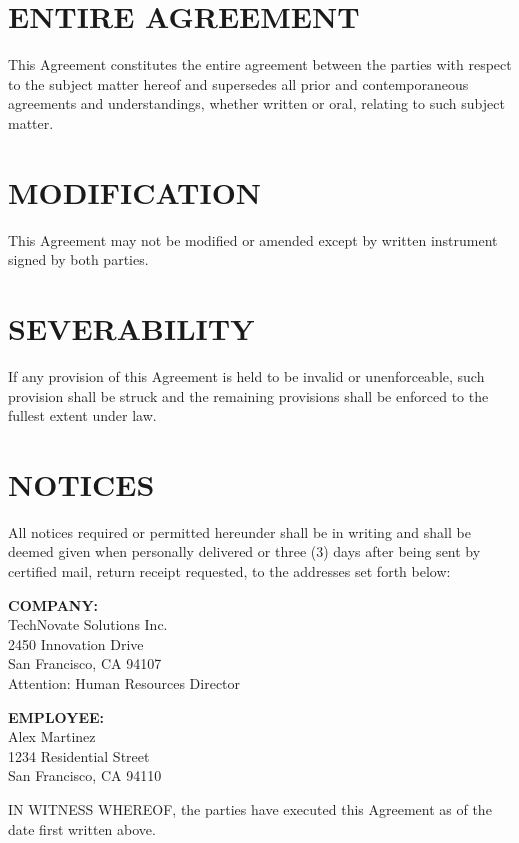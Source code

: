 \documentclass[12pt,letterpaper]{article}
\begin{document}
\section{ENTIRE AGREEMENT}

This Agreement constitutes the entire agreement between the parties with respect to the subject matter hereof and supersedes all prior and contemporaneous agreements and understandings, whether written or oral, relating to such subject matter.

\section{MODIFICATION}

This Agreement may not be modified or amended except by written instrument signed by both parties.

\section{SEVERABILITY}

If any provision of this Agreement is held to be invalid or unenforceable, such provision shall be struck and the remaining provisions shall be enforced to the fullest extent under law.

\section{NOTICES}

All notices required or permitted hereunder shall be in writing and shall be deemed given when personally delivered or three (3) days after being sent by certified mail, return receipt requested, to the addresses set forth below:

\vspace{0.2cm}
\noindent \textbf{COMPANY:}\\
TechNovate Solutions Inc.\\
2450 Innovation Drive\\
San Francisco, CA 94107\\
Attention: Human Resources Director

\vspace{0.2cm}
\noindent \textbf{EMPLOYEE:}\\
Alex Martinez\\
1234 Residential Street\\
San Francisco, CA 94110

\vspace{0.5cm}
\noindent IN WITNESS WHEREOF, the parties have executed this Agreement as of the date first written above.
\end{document}
